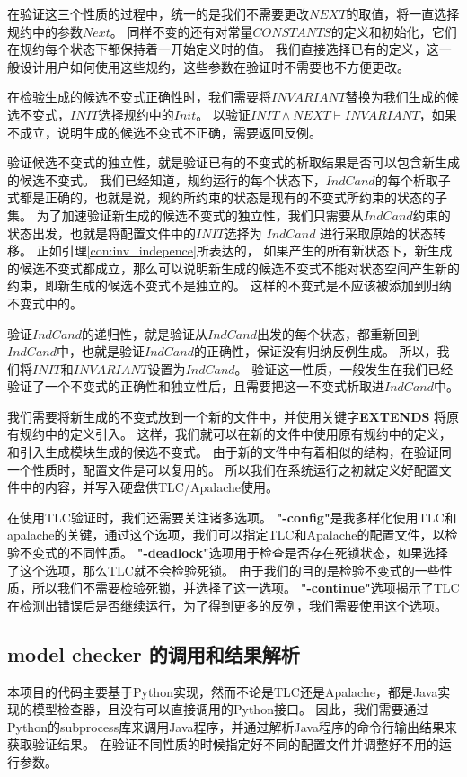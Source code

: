 在验证这三个性质的过程中，统一的是我们不需要更改$NEXT$的取值，将一直选择规约中的参数$Next$。
同样不变的还有对常量$CONSTANTS$的定义和初始化，它们在规约每个状态下都保持着一开始定义时的值。
我们直接选择已有的定义，这一般设计用户如何使用这些规约，这些参数在验证时不需要也不方便更改。

在检验生成的候选不变式正确性时，我们需要将$INVARIANT$替换为我们生成的候选不变式，$INIT$选择规约中的$Init$。
以验证$INIT \wedge NEXT \vdash INVARIANT$，如果不成立，说明生成的候选不变式不正确，需要返回反例。

验证候选不变式的独立性，就是验证已有的不变式的析取结果是否可以包含新生成的候选不变式。
我们已经知道，规约运行的每个状态下，$IndCand$的每个析取子式都是正确的，也就是说，规约所约束的状态是现有的不变式所约束的状态的子集。
为了加速验证新生成的候选不变式的独立性，我们只需要从$IndCand$约束的状态出发，也就是将配置文件中的$INIT$选择为 $IndCand$ 进行采取原始的状态转移。
正如引理\ref{con:inv_indepence}所表达的，
如果产生的所有新状态下，新生成的候选不变式都成立，那么可以说明新生成的候选不变式不能对状态空间产生新的约束，即新生成的候选不变式不是独立的。
这样的不变式是不应该被添加到归纳不变式中的。

验证$IndCand$的递归性，就是验证从$IndCand$出发的每个状态，都重新回到$IndCand$中，也就是验证$IndCand$的正确性，保证没有归纳反例生成。
所以，我们将$INIT$和$INVARIANT$设置为$IndCand$。
验证这一性质，一般发生在我们已经验证了一个不变式的正确性和独立性后，且需要把这一不变式析取进$IndCand$中。

我们需要将新生成的不变式放到一个新的文件中，并使用关键字\textbf{EXTENDS} 将原有规约中的定义引入。
这样，我们就可以在新的文件中使用原有规约中的定义，和引入生成模块生成的候选不变式。
由于新的\TLA 文件中有着相似的结构，在验证同一个性质时，配置文件是可以复用的。
所以我们在系统运行之初就定义好配置文件中的内容，并写入硬盘供TLC/Apalache使用。

在使用TLC验证时，我们还需要关注诸多选项。
\textbf{"-config"}是我多样化使用TLC和apalache的关键，通过这个选项，我们可以指定TLC和Apalache的配置文件，以检验不变式的不同性质。
\textbf{"-deadlock"}选项用于检查是否存在死锁状态，如果选择了这个选项，那么TLC就不会检验死锁。
由于我们的目的是检验不变式的一些性质，所以我们不需要检验死锁，并选择了这一选项。
\textbf{"-continue"}选项揭示了TLC在检测出错误后是否继续运行，为了得到更多的反例，我们需要使用这个选项。

\subsection{model checker 的调用和结果解析}
本项目的代码主要基于Python实现，然而不论是TLC还是Apalache，都是Java实现的模型检查器，且没有可以直接调用的Python接口。
因此，我们需要通过Python的subprocess库来调用Java程序，并通过解析Java程序的命令行输出结果来获取验证结果。
在验证不同性质的时候指定好不同的配置文件并调整好不用的运行参数。

